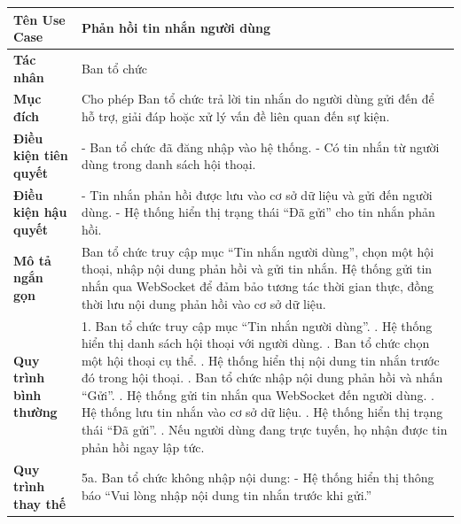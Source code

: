 \begin{table}[H]
\centering
\renewcommand{\arraystretch}{1.3}
\setlength{\tabcolsep}{8pt}
\begin{tabularx}{\textwidth}{|l|X|}
\hline
\textbf{Tên Use Case} & Phản hồi tin nhắn người dùng \\ \hline
\textbf{Tác nhân} & Ban tổ chức \\ \hline
\textbf{Mục đích} & Cho phép Ban tổ chức trả lời tin nhắn do người dùng gửi đến để hỗ trợ, giải đáp hoặc xử lý vấn đề liên quan đến sự kiện. \\ \hline
\textbf{Điều kiện tiên quyết} & 
- Ban tổ chức đã đăng nhập vào hệ thống. \newline
- Có tin nhắn từ người dùng trong danh sách hội thoại. \\ \hline
\textbf{Điều kiện hậu quyết} & 
- Tin nhắn phản hồi được lưu vào cơ sở dữ liệu và gửi đến người dùng. \newline
- Hệ thống hiển thị trạng thái “Đã gửi” cho tin nhắn phản hồi. \\ \hline
\textbf{Mô tả ngắn gọn} & 
Ban tổ chức truy cập mục “Tin nhắn người dùng”, chọn một hội thoại, nhập nội dung phản hồi và gửi tin nhắn. Hệ thống gửi tin nhắn qua WebSocket để đảm bảo tương tác thời gian thực, đồng thời lưu nội dung phản hồi vào cơ sở dữ liệu. \\ \hline
\textbf{Quy trình bình thường} &
1. Ban tổ chức truy cập mục “Tin nhắn người dùng”. \newline
2. Hệ thống hiển thị danh sách hội thoại với người dùng. \newline
3. Ban tổ chức chọn một hội thoại cụ thể. \newline
4. Hệ thống hiển thị nội dung tin nhắn trước đó trong hội thoại. \newline
5. Ban tổ chức nhập nội dung phản hồi và nhấn “Gửi”. \newline
6. Hệ thống gửi tin nhắn qua WebSocket đến người dùng. \newline
7. Hệ thống lưu tin nhắn vào cơ sở dữ liệu. \newline
8. Hệ thống hiển thị trạng thái “Đã gửi”. \newline
9. Nếu người dùng đang trực tuyến, họ nhận được tin phản hồi ngay lập tức. \\ \hline
\textbf{Quy trình thay thế} &
5a. Ban tổ chức không nhập nội dung: \newline
\hspace*{1em}- Hệ thống hiển thị thông báo “Vui lòng nhập nội dung tin nhắn trước khi gửi.” \newline

\end{tabularx}
\end{table}
